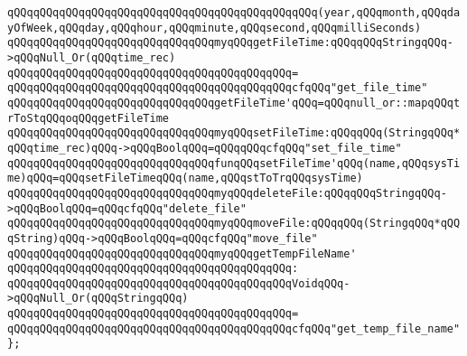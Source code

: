 \verb|qQQqqQQqqQQqqQQqqQQqqQQqqQQqqQQqqQQqqQQqqQQqqQQq(year,qQQqmonth,qQQqdayOfWeek,qQQqday,qQQqhour,qQQqminute,qQQqsecond,qQQqmilliSeconds)|\newline
\newline
\verb|qQQqqQQqqQQqqQQqqQQqqQQqqQQqqQQqmyqQQqgetFileTime:qQQqqQQqStringqQQq->qQQqNull_Or(qQQqtime_rec)|\newline
\verb|qQQqqQQqqQQqqQQqqQQqqQQqqQQqqQQqqQQqqQQqqQQq=|\newline
\verb|qQQqqQQqqQQqqQQqqQQqqQQqqQQqqQQqqQQqqQQqqQQqcfqQQq"get_file_time"|\newline
\newline
\verb|qQQqqQQqqQQqqQQqqQQqqQQqqQQqqQQqgetFileTime'qQQq=qQQqnull_or::mapqQQqtrToStqQQqoqQQqgetFileTime|\newline
\newline
\verb|qQQqqQQqqQQqqQQqqQQqqQQqqQQqqQQqmyqQQqsetFileTime:qQQqqQQq(StringqQQq*qQQqtime_rec)qQQq->qQQqBoolqQQq=qQQqqQQqcfqQQq"set_file_time"|\newline
\verb|qQQqqQQqqQQqqQQqqQQqqQQqqQQqqQQqfunqQQqsetFileTime'qQQq(name,qQQqsysTime)qQQq=qQQqsetFileTimeqQQq(name,qQQqstToTrqQQqsysTime)|\newline
\newline
\verb|qQQqqQQqqQQqqQQqqQQqqQQqqQQqqQQqmyqQQqdeleteFile:qQQqqQQqStringqQQq->qQQqBoolqQQq=qQQqcfqQQq"delete_file"|\newline
\verb|qQQqqQQqqQQqqQQqqQQqqQQqqQQqqQQqmyqQQqmoveFile:qQQqqQQq(StringqQQq*qQQqString)qQQq->qQQqBoolqQQq=qQQqcfqQQq"move_file"|\newline
\newline
\verb|qQQqqQQqqQQqqQQqqQQqqQQqqQQqqQQqmyqQQqgetTempFileName'|\newline
\verb|qQQqqQQqqQQqqQQqqQQqqQQqqQQqqQQqqQQqqQQqqQQq:|\newline
\verb|qQQqqQQqqQQqqQQqqQQqqQQqqQQqqQQqqQQqqQQqqQQqVoidqQQq->qQQqNull_Or(qQQqStringqQQq)|\newline
\verb|qQQqqQQqqQQqqQQqqQQqqQQqqQQqqQQqqQQqqQQqqQQq=|\newline
\verb|qQQqqQQqqQQqqQQqqQQqqQQqqQQqqQQqqQQqqQQqqQQqcfqQQq"get_temp_file_name"|\newline
\verb|};|\newline
\newline
\newline

